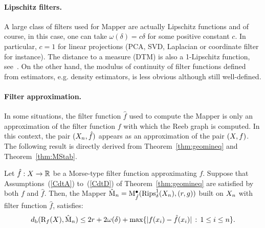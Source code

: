 \paragraph{Lipschitz filters.} A large class of filters used for Mapper are actually Lipschitz functions and of course, 
in this case, one can take $\omega(\delta) = c \delta$ 
for some positive constant $c$. In particular, $c=1$ for linear projections (PCA, SVD, Laplacian or coordinate filter for instance). 
The distance to a measure (DTM) is also a 1-Lipschitz function, see~\cite{Chazal11}. On the other hand, 
the modulus of continuity of filter functions defined from 
estimators, e.g. density estimators, is less obvious although still well-defined. 

\paragraph{Filter approximation.} In some situations, the filter function $\hat f$ used to compute the Mapper is only an approximation of 
the filter function $f$ with which the Reeb graph is computed. 
In this context,
the pair $(X_n, \hat f)$ appears as an approximation of the pair $(X,f)$.
The following result is directly derived from Theorem~\ref{thm:geomineq} and 
Theorem~\ref{thm:MStab}. 

\begin{cor} \label{cor:approxfilter}
Let $\hat f: X \rightarrow \mathbb{R}$ be a Morse-type filter function approximating $f$.
Suppose that Assumptions~(\ref{CdtA}) to~(\ref{CdtD}) of Theorem~\ref{thm:geomineq} are satisfied
by both $f$ and $\hat f$. 
Then, the Mapper $\hat{\mathrm{M}}_n  =   \mathrm{M}^\bullet_{\hat{f}}(\mathrm{Rips}_\delta^1(X_n),(r,g))$ built on $X_n$ with filter function $\hat f$,
satisfies:
$$d_{\rm b}(\mathrm{R}_f(X),  \hat{\mathrm{M}}_n )\leq 2r+2\omega(\delta)  + \max \{|f(x_i)-\hat f(x_i)|\,:\,1\leq i\leq n\}. $$
\end{cor}

